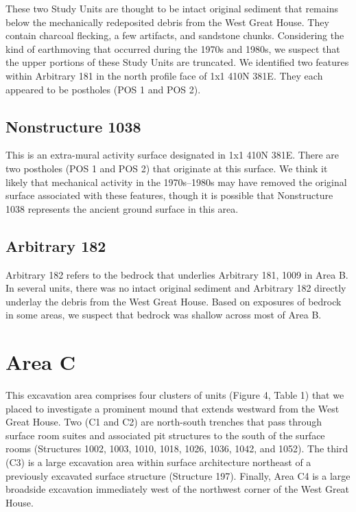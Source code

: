 \documentclass[
  12pt,
]{krantz}
\begin{document}
These two Study Units are thought to be intact original sediment that
remains below the mechanically redeposited debris from the West Great
House. They contain charcoal flecking, a few artifacts, and sandstone
chunks. Considering the kind of earthmoving that occurred during the
1970s and 1980s, we suspect that the upper portions of these Study Units
are truncated. We identified two features within Arbitrary 181 in the
north profile face of 1x1 410N 381E. They each appeared to be postholes
(POS 1 and POS 2).

\hypertarget{nonstructure-1038}{%
\subsection{Nonstructure 1038}\label{nonstructure-1038}}

This is an extra-mural activity surface designated in 1x1 410N 381E.
There are two postholes (POS 1 and POS 2) that originate at this
surface. We think it likely that mechanical activity in the 1970s--1980s
may have removed the original surface associated with these features,
though it is possible that Nonstructure 1038 represents the ancient
ground surface in this area.

\hypertarget{arbitrary-182}{%
\subsection{Arbitrary 182}\label{arbitrary-182}}

Arbitrary 182 refers to the bedrock that underlies Arbitrary 181, 1009
in Area B. In several units, there was no intact original sediment and
Arbitrary 182 directly underlay the debris from the West Great House.
Based on exposures of bedrock in some areas, we suspect that bedrock was
shallow across most of Area B.

\hypertarget{area-c}{%
\section{Area C}\label{area-c}}

This excavation area comprises four clusters of units (Figure 4, Table
1) that we placed to investigate a prominent mound that extends westward
from the West Great House. Two (C1 and C2) are north-south trenches that
pass through surface room suites and associated pit structures to the
south of the surface rooms (Structures 1002, 1003, 1010, 1018, 1026,
1036, 1042, and 1052). The third (C3) is a large excavation area within
surface architecture northeast of a previously excavated surface
structure (Structure 197). Finally, Area C4 is a large broadside
excavation immediately west of the northwest corner of the West Great
House.
\end{document}
